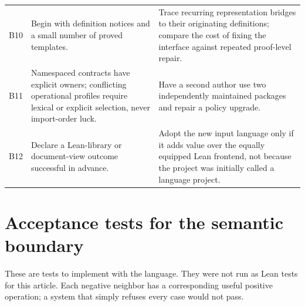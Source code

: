 \documentclass[11pt,letterpaper]{article}
\numberwithin{equation}{section}
\begin{document}
\begin{longtable}{@{}P{.07\textwidth}P{.39\textwidth}P{.46\textwidth}@{}}
B10 & Begin with definition notices and a small number of proved templates. & Trace
recurring representation bridges to their originating definitions; compare the
cost of fixing the interface against repeated proof-level repair.\\
B11 & Namespaced contracts have explicit owners; conflicting operational profiles
require lexical or explicit selection, never import-order luck. & Have a second
author use two independently maintained packages and repair a policy upgrade.\\
B12 & Declare a Lean-library or document-view outcome successful in advance. &
Adopt the new input language only if it adds value over the equally equipped
Lean frontend, not because the project was initially called a language project.\\
\bottomrule
\end{longtable}

\section{Acceptance tests for the semantic boundary}\label{app:tests}
These are tests to implement with the language. They were not run as Lean tests
for this article. Each negative neighbor has a corresponding useful positive
operation; a system that simply refuses every case would not pass.
\end{document}
